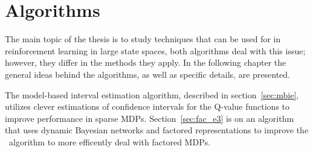 \chapter{Algorithms}
\label{ch:algo}

The main topic of the thesis is to study techniques that can be used for in
reinforcement learning in large state spaces, both algorithms deal with this
issue; however, they differ in the methods they apply. In the following chapter
the general ideas behind the algorithms, as well as specific details, are
presented. 

The model-based interval estimation algorithm, described in
section~\ref{sec:mbie}, utilizes clever estimations of confidence intervals for
the Q-value functions to improve performance in sparse MDPs.
Section~\ref{sec:fac_e3} is on an algorithm that uses dynamic Bayesian networks
and factored representations to improve the \etre\ algorithm to more efficently
deal with factored MDPs. 




